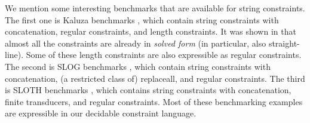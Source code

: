 We mention some interesting benchmarks that are available for 
string constraints. The first one is Kaluza 
benchmarks
\cite{Berkeley-JavaScript}, which contain
string constraints with concatenation, regular constraints, and length
constraints. It was shown in \cite{Vijay-length}
that almost all the constraints are already in
\emph{solved form} (in particular, also straight-line). Some of these length
constraints are also expressible as regular constraints.
The second is SLOG benchmarks \cite{fang-yu-circuits}, which contain
string constraints with concatenation, (a restricted class of) replaceall, and 
regular constraints. The third is SLOTH benchmarks \cite{HJLRV18}, which
contains string constraints with concatenation, finite transducers, and
regular constraints. Most of these benchmarking examples are expressible in our
decidable constraint language.


